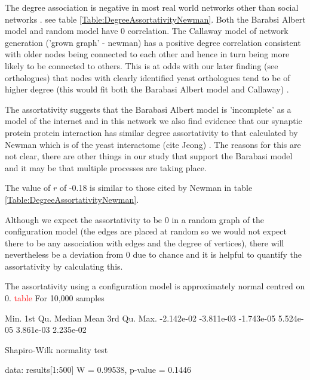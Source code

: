 The degree association is negative in most real world networks other than social networks \cite{newman2002assortative}.  see table \ref{Table:DegreeAssortativityNewman}. Both the Barabsi Albert model and random model have 0 correlation. The Callaway model of network generation ('grown graph' - newman) has a positive degree correlation consistent with older nodes being connected to each other and hence in turn being more likely to be connected to others. This is at odds with our later finding (see orthologues) that nodes with clearly identified yeast orthologues tend to be of higher degree (this would fit both the Barabasi Albert model and Callaway) . 

The assortativity suggests that the Barabasi Albert model is 'incomplete' as a model of the internet \cite{newman2002assortative} and in this network we also find evidence that our synaptic protein protein interaction has similar degree assortativity to that calculated by Newman which is of the yeast interactome (cite Jeong) . The reasons for this are not clear, there are other things in our study that support the Barabasi model and it may be that multiple processes are taking place. 

The value of $r$ of -0.18  is similar to those cited by Newman \cite{newman2002assortative} in table \ref{Table:DegreeAssortativityNewman}. 

Although we expect the assortativity to be 0 in a random graph of the configuration model (the edges are placed at random so we would not expect there to be any association with edges and the degree of vertices), there will nevertheless be a deviation from 0 due to chance and it is helpful to quantify the assortativity by calculating this. 

The assortativity using a configuration model  is approximately normal centred on 0.
\textcolor{red}{table}
For 10,000 samples   

Min.    1st Qu.     Median       Mean    3rd Qu.       Max. 
-2.142e-02 -3.811e-03 -1.743e-05  5.524e-05  3.861e-03  2.235e-02 

Shapiro-Wilk normality test

data:  results[1:500]
W = 0.99538, p-value = 0.1446


